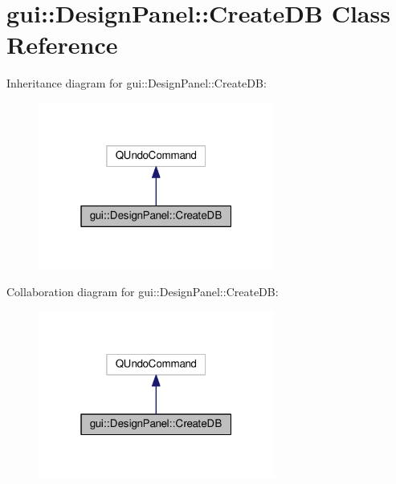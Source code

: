 \hypertarget{classgui_1_1DesignPanel_1_1CreateDB}{}\section{gui\+:\+:Design\+Panel\+:\+:Create\+DB Class Reference}
\label{classgui_1_1DesignPanel_1_1CreateDB}


Inheritance diagram for gui\+:\+:Design\+Panel\+:\+:Create\+DB\+:\nopagebreak
\begin{figure}[H]
\begin{center}
\leavevmode
\includegraphics[width=220pt]{classgui_1_1DesignPanel_1_1CreateDB__inherit__graph}
\end{center}
\end{figure}


Collaboration diagram for gui\+:\+:Design\+Panel\+:\+:Create\+DB\+:\nopagebreak
\begin{figure}[H]
\begin{center}
\leavevmode
\includegraphics[width=220pt]{classgui_1_1DesignPanel_1_1CreateDB__coll__graph}
\end{center}
\end{figure}
